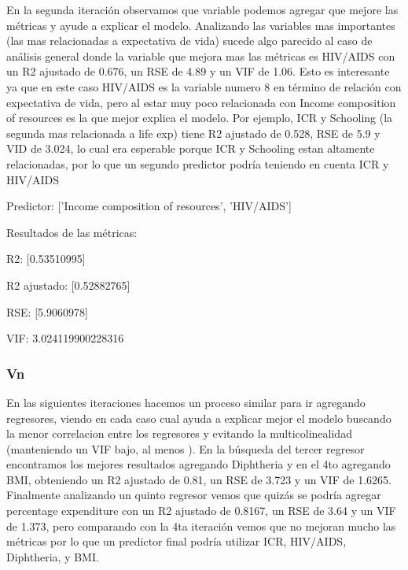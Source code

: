 En la segunda iteración observamos que variable podemos agregar que mejore las métricas y ayude a explicar el modelo. Analizando las variables mas importantes (las mas relacionadas a expectativa de vida) sucede algo parecido al caso de análisis general donde la variable que mejora mas las métricas es HIV/AIDS con un R2 ajustado de 0.676, un RSE de 4.89 y un VIF de 1.06. Esto es interesante ya que en este caso HIV/AIDS es la variable numero 8 en término de relación con expectativa de vida, pero al estar muy poco relacionada con Income composition of resources es la que mejor explica el modelo. Por ejemplo, ICR y Schooling (la segunda mas relacionada a life exp) tiene R2 ajustado de 0.528, RSE de 5.9 y VID de 3.024, lo cual era esperable porque ICR y Schooling estan altamente relacionadas, por lo que un segundo predictor podría teniendo en cuenta ICR y HIV/AIDS


Predictor: ['Income composition of resources', 'HIV/AIDS']

Resultados de las métricas:

R2: [0.53510995]

R2 ajustado: [0.52882765]

RSE: [5.9060978]

VIF: 3.024119900228316

\subsubsection{Vn}
En las siguientes iteraciones hacemos un proceso similar para ir agregando regresores, viendo en cada caso cual ayuda a explicar mejor el modelo buscando la menor correlacion entre los regresores y evitando la multicolinealidad (manteniendo un VIF bajo, al menos ). En la búsqueda del tercer regresor encontramos los mejores resultados agregando Diphtheria y en el 4to agregando BMI, obteniendo un R2 ajustado de 0.81, un RSE de 3.723 y un VIF de 1.6265. Finalmente analizando un quinto regresor vemos que quizás se podría agregar percentage expenditure con un R2 ajustado de 0.8167, un RSE de 3.64 y un VIF de 1.373, pero comparando con la 4ta iteración vemos que no mejoran mucho las métricas por lo que un predictor final podría utilizar ICR, HIV/AIDS, Diphtheria, y BMI.

